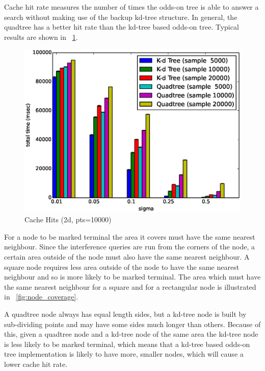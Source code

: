 \documentclass[mcs]{scsthesis}
\begin{document}
Cache hit rate measures the number of times the odds-on tree is able to answer
a search without making use of the backup kd-tree structure. In general, the
quadtree has a better hit rate than the kd-tree based odds-on tree. Typical
results are shown in ~\ref{fig:2d_kd_qt_hits}.

\begin{figure}
\begin{center}
\includegraphics[scale=0.5]{diagrams/2d_qt_kt_pts10000_hits.eps}
\caption{Cache Hits (2d, pts=10000)}
\label{fig:2d_kd_qt_hits}
\end{center}
\end{figure}

For a node to be marked terminal the area it covers must have the same nearest
neighbour. Since the interference queries are run from the corners of the node,
a certain area outside of the node must also have the same nearest neighbour.
A square node requires less area outside of the node to have the same nearest
neighbour and so is more likely to be marked terminal. The area which must have
the same nearest neighbour for a square and for a rectangular node is
illustrated in ~\ref{fig:node_coverage}.

A quadtree node always has equal length sides, but a kd-tree node is built
by sub-dividing points and may have some sides much longer than others. Because
of this, given a quadtree node and a kd-tree node of the same area the kd-tree
node is less likely to be marked terminal, which means that a kd-tree based
odds-on tree implementation is likely to have more, smaller nodes, which will
cause a lower cache hit rate.
\end{document}
